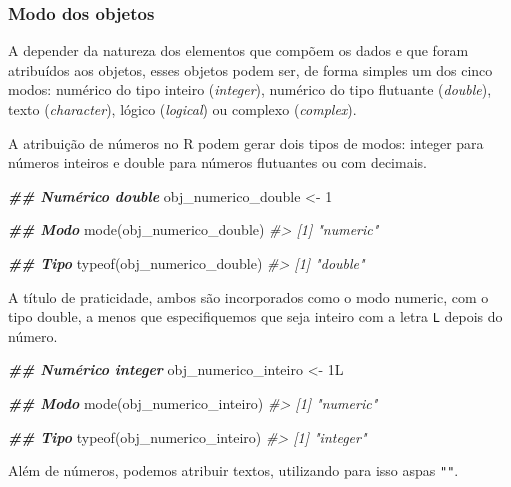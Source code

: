 \documentclass[
]{book}
\newenvironment{Shaded}{\begin{snugshade}}{\end{snugshade}}
\newcommand{\CommentTok}[1]{\textcolor[rgb]{0.37,0.37,0.37}{\textit{#1}}}
\newcommand{\DecValTok}[1]{\textcolor[rgb]{0.06,0.06,0.06}{#1}}
\newcommand{\DocumentationTok}[1]{\textcolor[rgb]{0.37,0.37,0.37}{\textbf{\textit{#1}}}}
\newcommand{\FunctionTok}[1]{\textcolor[rgb]{0,0,0}{#1}}
\newcommand{\NormalTok}[1]{#1}
\newcommand{\OtherTok}[1]{\textcolor[rgb]{0.37,0.37,0.37}{#1}}
\begin{document}
\hypertarget{modo-dos-objetos}{%
\subsubsection{Modo dos objetos}\label{modo-dos-objetos}}

A depender da natureza dos elementos que compõem os dados e que foram atribuídos aos objetos, esses objetos podem ser, de forma simples um dos cinco modos: numérico do tipo inteiro (\emph{integer}), numérico do tipo flutuante (\emph{double}), texto (\emph{character}), lógico (\emph{logical}) ou complexo (\emph{complex}).

A atribuição de números no R podem gerar dois tipos de modos: integer para números inteiros e double para números flutuantes ou com decimais.

\begin{Shaded}
\begin{Highlighting}[]
\DocumentationTok{\#\# Numérico double}
\NormalTok{obj\_numerico\_double }\OtherTok{\textless{}{-}} \DecValTok{1}

\DocumentationTok{\#\# Modo}
\FunctionTok{mode}\NormalTok{(obj\_numerico\_double)}
\CommentTok{\#\textgreater{} [1] "numeric"}

\DocumentationTok{\#\# Tipo}
\FunctionTok{typeof}\NormalTok{(obj\_numerico\_double)}
\CommentTok{\#\textgreater{} [1] "double"}
\end{Highlighting}
\end{Shaded}

A título de praticidade, ambos são incorporados como o modo numeric, com o tipo double, a menos que especifiquemos que seja inteiro com a letra \texttt{L} depois do número.

\begin{Shaded}
\begin{Highlighting}[]
\DocumentationTok{\#\# Numérico integer}
\NormalTok{obj\_numerico\_inteiro }\OtherTok{\textless{}{-}}\NormalTok{ 1L}

\DocumentationTok{\#\# Modo}
\FunctionTok{mode}\NormalTok{(obj\_numerico\_inteiro)}
\CommentTok{\#\textgreater{} [1] "numeric"}

\DocumentationTok{\#\# Tipo}
\FunctionTok{typeof}\NormalTok{(obj\_numerico\_inteiro)}
\CommentTok{\#\textgreater{} [1] "integer"}
\end{Highlighting}
\end{Shaded}

Além de números, podemos atribuir textos, utilizando para isso aspas \texttt{""}.
\end{document}
